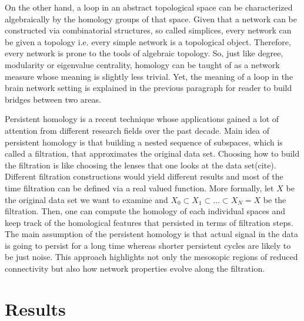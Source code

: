 \documentclass[9pt,twocolumn,twoside,lineno]{pnas-new}
\begin{document}
On the other hand, a loop in an abstract topological space can be characterized algebraically by the homology groups of that space. Given that a network can be constructed via combinatorial structures, so called simplices, every network can be given a topology i.e. every simple network is a topological object. Therefore, every network is prone to the tools of algebraic topology. So, just like degree, modularity or eigenvalue centrality, homology can be taught of as a network measure whose meaning is slightly less trivial. Yet, the meaning of a loop in the brain network setting is explained in the previous paragraph for reader to build bridges between two areas.

Persistent homology is a recent technique whose applications gained a lot of attention from different research fields over the past decade. Main idea of persistent homology is that building a nested sequence of subspaces, which is called a filtration, that approximates the original data set. Choosing how to build the filtration is like choosing the lenses that one looks at the data set(cite). Different filtration constructions would yield different results and most of the time filtration can be defined via a real valued function. More formally, let $X$ be the original data set we want to examine and $X_{0}\subset X_{1}\subset...\subset X_{N}=X $ be the filtration. Then, one can compute the homology of each individual spaces and keep track of the homological features that persisted in terms of filtration steps. The main assumption of the persistent homology is that actual signal in the data is going to persist for a long time whereas shorter persistent cycles are likely to be just noise. This approach highlights not only the mesosopic regions of reduced connectivity but also how network properties evolve along the filtration.



\section*{Results}
\end{document}
